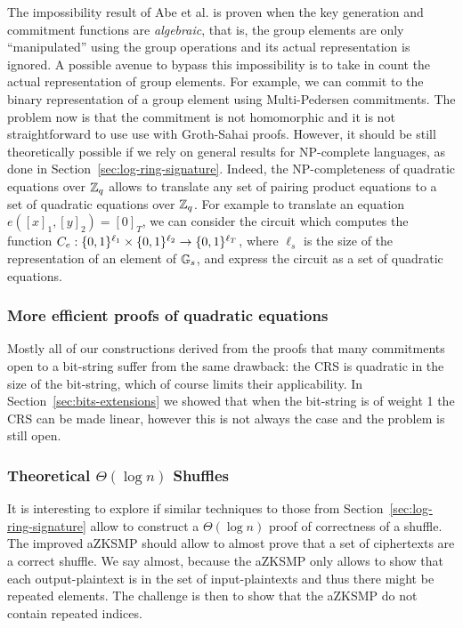 The impossibility result of Abe et al. is proven when the key generation and commitment functions are \emph{algebraic}, that is, the group elements are only ``manipulated'' using the group operations and its actual representation is ignored.
A possible avenue to bypass this impossibility is to take in count the actual representation of group elements. For example, we can commit to the binary representation of a group element using Multi-Pedersen commitments. The problem now is that the commitment is not homomorphic and it is not straightforward to use use with Groth-Sahai proofs. However, it should be still theoretically possible if we rely on general results for NP-complete languages, as done in Section~\ref{sec:log-ring-signature}.
Indeed, the NP-completeness of quadratic equations over $\mathbb{Z}_q$ allows to translate any set of pairing product equations to a set of quadratic equations over $\mathbb{Z}_q$. For example to translate an equation $e([x]_1,[y]_2)=[0]_T$, we can consider the circuit which computes the function $C_e:\{0,1\}^{\ell_1}\times \{0,1\}^{\ell_2} \to\{0,1\}^{\ell_T}$, where $\ell_s$ is the size of the representation of an element of $\mathbb{G}_s$, and express the circuit as a set of quadratic equations.

\subsubsection{More efficient proofs of quadratic equations}
Mostly all of our constructions derived from the proofs that many commitments open to a bit-string suffer from the same drawback: the CRS is quadratic in the size of the bit-string, which of course limits their applicability. In Section~\ref{sec:bits-extensions} we showed that when the bit-string is of weight 1 the CRS can be made linear, however this is not always the case and the problem is still open.
 
\subsubsection{Theoretical $\Theta(\log n)$ Shuffles}
It is interesting to explore if similar techniques to those from Section~\ref{sec:log-ring-signature} allow to construct a $\Theta(\log n)$ proof of correctness of a shuffle. The improved aZKSMP should allow to almost prove that a set of ciphertexts are a correct shuffle. We say almost, because the aZKSMP only allows to show that each output-plaintext is in the set of input-plaintexts and thus there might be repeated elements. The challenge is then to show that the aZKSMP do not contain repeated indices.

